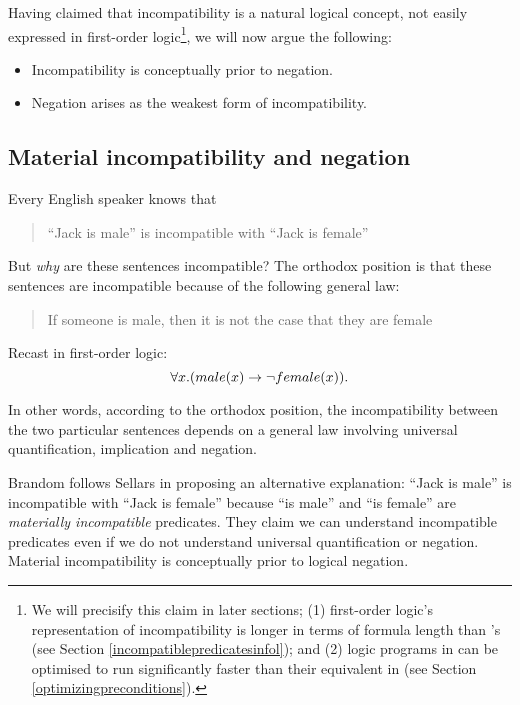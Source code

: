 Having claimed that incompatibility is a natural logical concept, not
easily expressed in first-order logic\footnote{We will precisify this
  claim in later sections; (1) first-order logic's representation of
  incompatibility is longer in terms of formula length than
  \cathoristic{}'s (see Section \ref{incompatiblepredicatesinfol});
  and (2) logic programs in \cathoristic{} can be optimised to run
  significantly faster than their equivalent in \fol{} (see Section
  \ref{optimizingpreconditions}).}, we will now argue the following:

\begin{itemize}

\item Incompatibility is conceptually prior to negation.

\item Negation arises as the weakest form of incompatibility.

\end{itemize}

\subsection{Material incompatibility and negation}

\NI Every English speaker knows that
\begin{quote}
``Jack is male'' is incompatible with ``Jack is female''
\end{quote}

\NI But \emph{why} are these sentences incompatible? The orthodox
position is that these sentences are incompatible because of the
following general law:
\begin{quote}
If someone is male, then it is not the case that they are female
\end{quote}
Recast in first-order logic:
\[
\forall x. ( male(x) \rightarrow \neg female(x) ).
\]

\NI In other words, according to the orthodox position, the
incompatibility between the two particular sentences depends on a
general law involving universal quantification, implication and
negation.

Brandom \cite{brandom2} follows Sellars in proposing an alternative explanation: ``Jack
is male'' is incompatible with ``Jack is female'' because ``is male''
and ``is female'' are \emph{materially incompatible} predicates.  They
claim we can understand incompatible predicates even if we do
not understand universal quantification or negation.  
Material incompatibility is conceptually prior to logical negation.

